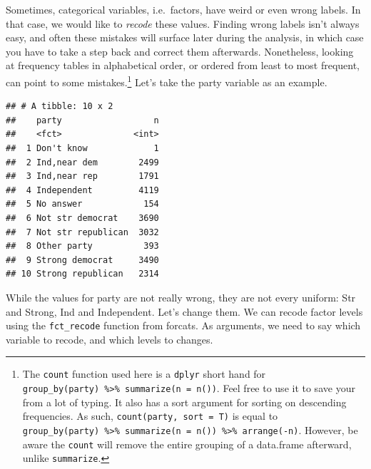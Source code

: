 \documentclass[]{tufte-book}
\newenvironment{Shaded}{}{}
\newcommand{\ErrorTok}[1]{\textcolor[rgb]{1.00,0.00,0.00}{\textbf{#1}}}
\newcommand{\KeywordTok}[1]{\textcolor[rgb]{0.00,0.44,0.13}{\textbf{#1}}}
\newcommand{\NormalTok}[1]{#1}
\newcommand{\OperatorTok}[1]{\textcolor[rgb]{0.40,0.40,0.40}{#1}}
\newcommand{\StringTok}[1]{\textcolor[rgb]{0.25,0.44,0.63}{#1}}
\begin{document}
Sometimes, categorical variables, i.e.~factors, have weird or even wrong labels. In that case, we would like to \emph{recode} these values. Finding wrong labels isn't always easy, and often these mistakes will surface later during the analysis, in which case you have to take a step back and correct them afterwards. Nonetheless, looking at frequency tables in alphabetical order, or ordered from least to most frequent, can point to some mistakes.\footnote{The \texttt{count} function used here is a \texttt{dplyr} short hand for \texttt{group\_by(party)\ \%\textgreater{}\%\ summarize(n\ =\ n())}. Feel free to use it to save your from a lot of typing. It also has a sort argument for sorting on descending frequencies. As such, \texttt{count(party,\ sort\ =\ T)} is equal to \texttt{group\_by(party)\ \%\textgreater{}\%\ summarize(n\ =\ n())\ \%\textgreater{}\%\ arrange(-n)}. However, be aware the \texttt{count} will remove the entire grouping of a data.frame afterward, unlike \texttt{summarize}.} Let's take the party variable as an example.

\begin{Shaded}
\end{Shaded}

\begin{verbatim}
## # A tibble: 10 x 2
##    party                  n
##    <fct>              <int>
##  1 Don't know             1
##  2 Ind,near dem        2499
##  3 Ind,near rep        1791
##  4 Independent         4119
##  5 No answer            154
##  6 Not str democrat    3690
##  7 Not str republican  3032
##  8 Other party          393
##  9 Strong democrat     3490
## 10 Strong republican   2314
\end{verbatim}

While the values for party are not really wrong, they are not every uniform: Str and Strong, Ind and Independent. Let's change them. We can recode factor levels using the \texttt{fct\_recode} function from forcats. As arguments, we need to say which variable to recode, and which levels to changes.

\begin{Shaded}
\end{Shaded}
\end{document}
